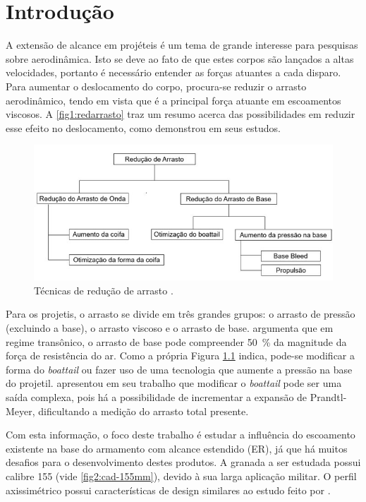 \chapter{Introdução}
\graphicspath{{chapter-01/img-cap01/}}

A extensão de alcance em projéteis é um tema de grande interesse para pesquisas sobre aerodinâmica. Isto se deve ao fato de que estes corpos são lançados a altas velocidades, portanto é necessário entender as forças atuantes a cada disparo. Para aumentar o deslocamento do corpo, procura-se reduzir o arrasto aerodinâmico, tendo em vista que é a principal força atuante em escoamentos viscosos. A \autoref{fig1:redarrasto} traz um resumo acerca das possibilidades em reduzir esse efeito no deslocamento, como \citeauthor{Dali2018a} demonstrou em seus estudos.

\begin{figure}[!ht]
	\centering
	\includegraphics[width=1.0\textwidth]{foto01-reducao-arrasto.png}
	\caption[Técnicas de redução de arrasto, traduzido e adaptado.]{Técnicas de redução de arrasto \cite{Dali2018a}.}
	\label{fig1:redarrasto}
\end{figure}

Para os projetis, o arrasto se divide em três grandes grupos: o arrasto de pressão (excluindo a base), o arrasto viscoso e o arrasto de base. \citeauthor{Sahu1985} argumenta que em regime transônico, o arrasto de base pode compreender \qty{50}{\percent} da magnitude da força de resistência do ar. Como a própria Figura \ref{fig1:redarrasto} indica, pode-se modificar a forma do \textit{boattail} ou fazer uso de uma tecnologia que aumente a pressão na base do projetil. \citeauthor{Sedney1966} apresentou em seu trabalho que modificar o \textit{boattail} pode ser uma saída complexa, pois há a possibilidade de incrementar a expansão de Prandtl-Meyer, dificultando a medição do arrasto total presente.

Com esta informação, o foco deste trabalho é estudar a influência do escoamento existente na base do armamento com alcance estendido (ER), já que há muitos desafios para o desenvolvimento destes produtos. A granada a ser estudada possui calibre \qty{155}{\millimetre} (vide \autoref{fig2:cad-155mm}), devido à sua larga aplicação militar. O perfil axissimétrico possui características de design similares ao estudo feito por \citeauthor{Mahmoud2009}.

